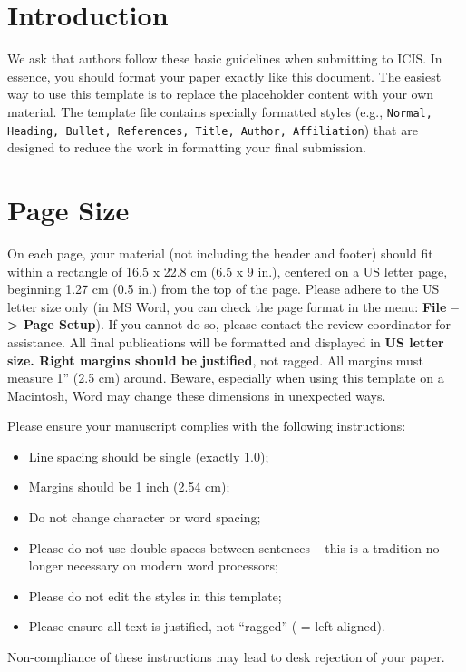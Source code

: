\documentclass{icis}
\begin{document}
\section{Introduction}

We ask that authors follow these basic guidelines when submitting to ICIS. In
essence, you should format your paper exactly like this document. The easiest
way to use this template is to replace the placeholder content with your own
material. The template file contains specially formatted styles (e.g.,
\texttt{Normal, Heading, Bullet, References, Title, Author, Affiliation}) that
are designed to reduce the work in formatting your final submission.

\section{Page Size}
On each page, your material (not including the header and footer) should fit within a rectangle of 16.5 x 22.8 cm (6.5 x 9 in.), centered on a US letter page, beginning 1.27 cm (0.5 in.) from the top of the page.  Please adhere to the US letter size only (in MS Word, you can check the page format in the menu: \textbf{File --> Page Setup}). If you cannot do so, please contact the review coordinator for assistance. All final publications will be formatted and displayed in \textbf{US letter size. Right margins should be justified}, not ragged. All margins must measure 1” (2.5 cm) around. Beware, especially when using this template on a Macintosh, Word may change these dimensions in unexpected ways.

Please ensure your manuscript complies with the following instructions:
\begin{itemize}
    \item Line spacing should be single (exactly 1.0);
    \item Margins should be 1 inch (2.54 cm);
    \item Do not change character or word spacing;
    \item Please do not use double spaces between sentences – this is a tradition no longer necessary on modern word processors;
    \item Please do not edit the styles in this template;
    \item Please ensure all text is justified, not “ragged” ( = left-aligned).
\end{itemize}
Non-compliance of these instructions may lead to desk rejection of your paper.
\end{document}
